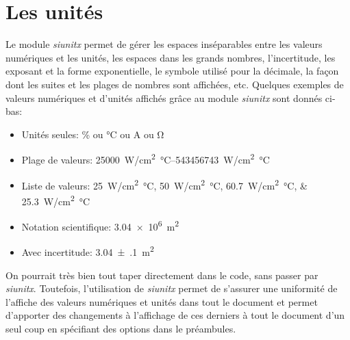 \documentclass[../exemple_master.tex]{subfiles}
\begin{document}
\section{Les unités}

Le module \emph{siunitx} permet de gérer les espaces inséparables entre les valeurs numériques et les unités, les espaces dans les grands nombres, l'incertitude, les exposant et la forme exponentielle, le symbole utilisé pour la décimale, la façon dont les suites et les plages de nombres sont affichées, etc. Quelques exemples de valeurs numériques et d'unités affichés grâce au module \emph{siunitx} sont donnés ci-bas: 

\begin{itemize}
\item Unités seules: \si{\percent} ou \si{\celsius} ou \si{\ampere} ou \si{\ohm}
\item Plage de valeurs: \SIrange{25000}{543456743}{W/cm^2 \celsius}
\item Liste de valeurs: \SIlist{25;50;60.7;25.3}{W/cm^2 \celsius}
\item Notation scientifique: \SI{3.04e6}{m^2}
\item Avec incertitude: \SI{3.04(10)}{m^2}
\end{itemize}

On pourrait très bien tout taper directement dans le code, sans passer par \emph{siunitx}. Toutefois, l'utilisation de \emph{siunitx} permet de s'assurer une uniformité de l'affiche des valeurs numériques et unités dans tout le document et permet d'apporter des changements à l'affichage de ces derniers à tout le document d'un seul coup en spécifiant des options dans le préambules.
\end{document}
